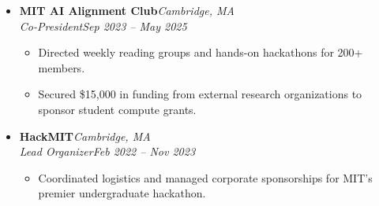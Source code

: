 \documentclass[10pt]{article}
\newcommand{\splitEntry}[2]{#1\hfill\textit{#2}}
\begin{document}
  \begin{itemize}
    \item {
      \splitEntry{\textbf{MIT AI Alignment Club}}{Cambridge, MA} \\
      \splitEntry{\textit{Co-President}}{Sep 2023 -- May 2025}

      \begin{itemize}
        \item Directed weekly reading groups and hands-on hackathons for 200+ members.
        \item Secured \$15,000 in funding from external research organizations to sponsor student compute grants.
      \end{itemize}
    }
    \item {
      \splitEntry{\textbf{HackMIT}}{Cambridge, MA} \\
      \splitEntry{\textit{Lead Organizer}}{Feb 2022 -- Nov 2023}

      \begin{itemize}
        \item Coordinated logistics and managed corporate sponsorships for MIT's premier undergraduate hackathon.
      \end{itemize}
    }
  \end{itemize}
\end{document}
